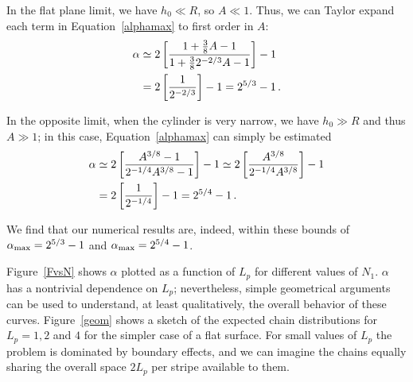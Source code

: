 In the flat plane limit, we have ${h_0} \ll R$, so $A \ll 1$.  Thus, we can Taylor expand each term in Equation~\ref{alphamax} to first order in $A$:
\begin{align}
	\alpha &\simeq 2\left[\frac{1 + \frac{3}{8}A - 1}{1 + \frac{3}{8} 2^{-2/3} A - 1}\right] - 1 \notag \\
	&= 2\left[\frac{1}{2^{-2/3}}\right] - 1 = 2^{5/3} - 1 \,.
\end{align}

In the opposite limit, when the cylinder is very narrow, we have $h_0 \gg R$ and thus $A \gg 1$; in this case, Equation~\ref{alphamax} can simply be estimated
\begin{align}
	\alpha &\simeq 2\left[\frac{A^{3/8}-1}{2^{-1/4}A^{3/8}-1}\right] - 1 \simeq 2\left[\frac{A^{3/8}}{2^{-1/4}A^{3/8}}\right] - 1 \notag \\
	&= 2\left[\frac{1}{2^{-1/4}}\right] - 1 = 2^{5/4} - 1 \,.
\end{align}

We find that our numerical results are, indeed, within these bounds of $\alpha_{\rm max} = 2^{5/3}-1$ and $\alpha_{\rm max} = 2^{5/4} - 1$.
 
Figure~\ref{FvsN} shows $\alpha$ plotted as a function of $L_p$ for different values of $N_1$.
$\alpha$ has a nontrivial dependence on $L_p$; nevertheless, 
simple geometrical arguments can be used to understand, at least qualitatively, the overall
behavior of these curves. Figure~\ref{geom} shows a sketch of the expected chain distributions 
for $L_p=1,2$ and $4$ for the simpler case of a flat surface.
For small values of $L_p$ the problem is dominated by boundary effects, and we can imagine 
the chains equally sharing the overall space $2L_p$ per stripe available to them.


